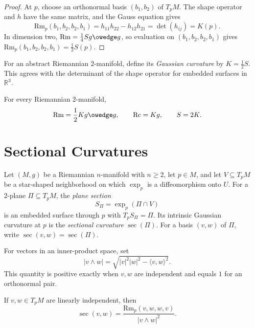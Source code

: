 \begin{proof}
\sketch
At $p$, choose an orthonormal basis $(b_1,b_2)$ of $T_pM$.  The shape
operator and $h$ have the same matrix, and the Gauss equation gives
\[
\mathrm{Rm}_p(b_1,b_2,b_2,b_1)
=h_{11}h_{22}-h_{12}h_{21}=\det(h_{ij})=K(p).
\]
In dimension two,
$\mathrm{Rm}=\tfrac14Sg\owedge g$, so evaluation on
$(b_1,b_2,b_2,b_1)$ gives $\mathrm{Rm}_p(b_1,b_2,b_2,b_1)=\tfrac12S(p)$.
\end{proof}

For an abstract Riemannian $2$-manifold, define its \emph{Gaussian curvature}
by $K=\tfrac12S$.  This agrees with the determinant of the shape operator for
embedded surfaces in $\mathbb R^3$.

\begin{corollary}
\label{cor:riemann-two-manifold-curvatures}

For every Riemannian $2$-manifold,
\[
\mathrm{Rm}=\frac12K g\owedge g,
\qquad
\mathrm{Rc}=Kg,
\qquad
S=2K.
\]
\end{corollary}

\section{Sectional Curvatures}

Let $(M,g)$ be a Riemannian $n$-manifold with $n\geq2$, let $p\in M$, and
let $V\subseteq T_pM$ be a star-shaped neighborhood on which $\exp_p$ is a
diffeomorphism onto $U$.  For a $2$-plane $\Pi\subseteq T_pM$, the
\emph{plane section}
\[
S_\Pi=\exp_p(\Pi\cap V)
\]
is an embedded surface through $p$ with $T_pS_\Pi=\Pi$.  Its intrinsic
Gaussian curvature at $p$ is the \emph{sectional curvature} $\sec(\Pi)$.
For a basis $(v,w)$ of $\Pi$, write $\sec(v,w)=\sec(\Pi)$.

For vectors in an inner-product space, set
\begin{equation}
|v\wedge w|=\sqrt{|v|^2|w|^2-\langle v,w\rangle^2}. \tag{8.27}
\end{equation}
This quantity is positive exactly when $v,w$ are independent and equals $1$
for an orthonormal pair.

\begin{proposition}
\label{prop:sectional-curvature-formula}
If $v,w\in T_pM$ are linearly independent, then
\[
\sec(v,w)=\frac{\mathrm{Rm}_p(v,w,w,v)}{|v\wedge w|^2}.
\]
\end{proposition}

